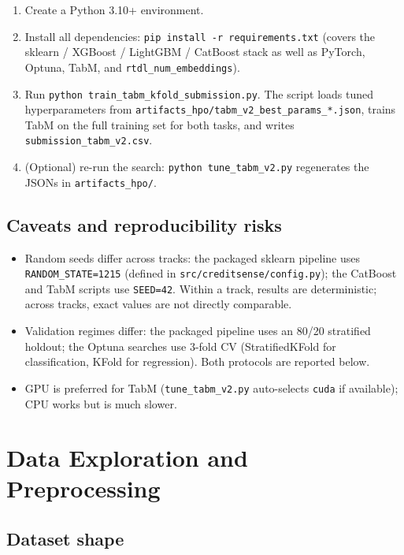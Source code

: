 \documentclass[11pt,a4paper]{article}
\begin{document}
\begin{enumerate}[leftmargin=*,nosep]
  \item Create a Python 3.10+ environment.
  \item Install all dependencies: \texttt{pip install -r requirements.txt} (covers the sklearn / XGBoost / LightGBM / CatBoost stack as well as PyTorch, Optuna, TabM, and \texttt{rtdl\_num\_embeddings}).
  \item Run \texttt{python train\_tabm\_kfold\_submission.py}. The script loads tuned hyperparameters from \texttt{artifacts\_hpo/tabm\_v2\_best\_params\_*.json}, trains TabM on the full training set for both tasks, and writes \texttt{submission\_tabm\_v2.csv}.
  \item (Optional) re-run the search: \texttt{python tune\_tabm\_v2.py} regenerates the JSONs in \texttt{artifacts\_hpo/}.
\end{enumerate}

\subsection{Caveats and reproducibility risks}

\begin{itemize}[leftmargin=*,nosep]
  \item Random seeds differ across tracks: the packaged sklearn pipeline uses \texttt{RANDOM\_STATE=1215} (defined in \texttt{src/creditsense/config.py}); the CatBoost and TabM scripts use \texttt{SEED=42}. Within a track, results are deterministic; across tracks, exact values are not directly comparable.
  \item Validation regimes differ: the packaged pipeline uses an 80/20 stratified holdout; the Optuna searches use 3-fold CV (StratifiedKFold for classification, KFold for regression). Both protocols are reported below.
  \item GPU is preferred for TabM (\texttt{tune\_tabm\_v2.py} auto-selects \texttt{cuda} if available); CPU works but is much slower.
\end{itemize}

\section{Data Exploration and Preprocessing}

\subsection{Dataset shape}
\end{document}
